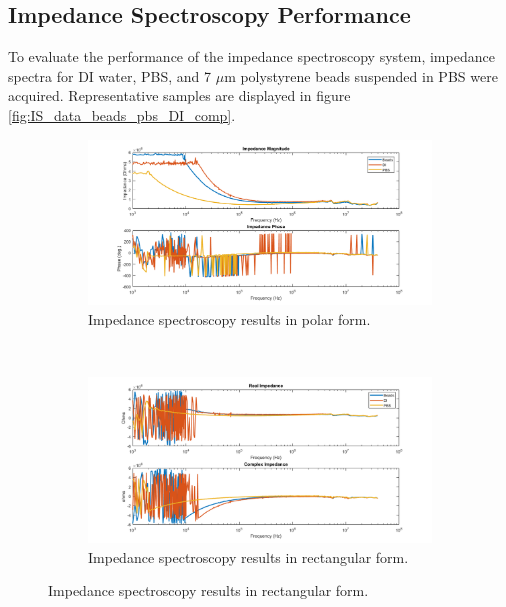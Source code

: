 \subsection{Impedance Spectroscopy Performance}



\par To evaluate the performance of the impedance spectroscopy system, impedance spectra for DI water, PBS, and 7 $\mu$m polystyrene beads suspended in PBS were acquired. Representative samples are displayed in figure \ref{fig:IS_data_beads_pbs_DI_comp}. 

\begin{figure}[h]
    \centering
    \begin{subfigure}[b]{\textwidth}
        \centering
        \includegraphics[width=\textwidth]{images/raw_IS_data_mag_phase.png}
        \caption{Impedance spectroscopy results in polar form.}
    \end{subfigure}
    \\
    \vspace{0.1 in}
    \begin{subfigure}[b]{\textwidth}
        \centering
        \includegraphics[width=\textwidth]{images/raw_IS_data_real_imag.png}
        \caption{Impedance spectroscopy results in rectangular form.}

\end{subfigure}
\end{figure}

